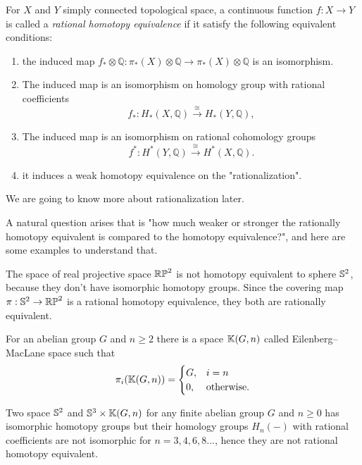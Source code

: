 \begin{definition}
	For \(X\) and \(Y\) simply connected topological space, a continuous function \(f: X \to Y\) is called a \emph{rational homotopy equivalence} if it satisfy the following equivalent conditions: 
	\begin{enumerate}
		\item the induced map \(f_\ast \otimes \mathbb Q: \pi_\ast(X) \otimes \mathbb Q \to \pi_\ast(X) \otimes \mathbb Q\) is an isomorphism.
		\item The induced map is an isomorphism on homology group with rational coefficients 
		\[f_\ast: H_\ast(X,\mathbb Q) \xrightarrow{\cong} H_\ast(Y,\mathbb Q),\]
		\item The induced map is an isomorphism on rational cohomology groups
		\[f^\ast : H^\ast(Y, \mathbb Q) \xrightarrow{\cong} H^\ast(X, \mathbb Q).\]
		\item it induces a weak homotopy equivalence on the "rationalization".
	\end{enumerate}
	We are going to know more about rationalization later.
\end{definition}

A natural question arises that is "how much weaker or stronger the rationally homotopy equivalent is compared to the homotopy equivalence?", and here are some examples to understand that.

\begin{example}
	The space of real projective space \(\mathbb{RP}^{2}\) is not homotopy equivalent to sphere \(\mathbb{S}^{2}\), because they don't have isomorphic homotopy groups. 
	Since the covering map \(\pi: \mathbb{S}^{2} \to \mathbb{RP}^{2}\) is a rational homotopy equivalence, they both are rationally equivalent.
\end{example} 

\begin{definition}
	For an abelian group \(G\) and \(n \geq 2\) there is a space \(\mathbb{K}(G, n)\) called Eilenberg–MacLane space such that 
	\[\pi_i(\mathbb{K}(G, n)) = \begin{cases}
		G, & i = n\\
		0, & \text{otherwise.}
	\end{cases}\]
\end{definition}

\begin{example}
	Two space \(\mathbb{S}^{2}\) and \(\mathbb{S}^{3} \times \mathbb{K}(G, n)\) for any finite abelian group \(G\) and \(n \geq 0\) has isomorphic homotopy groups but their homology groups \(H_n(-)\) with rational coefficients are not isomorphic for \(n = 3, 4, 6, 8 \dots\), hence they are not rational homotopy equivalent.
\end{example}


